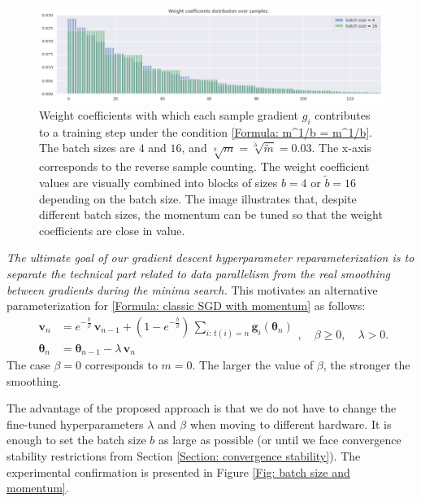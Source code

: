 \documentclass[12pt,a4paper]{amsart}
\numberwithin{equation}{section}
\theoremstyle{remark}
\begin{document}
\begin{figure}
	\centering
	\includegraphics[width=16cm,keepaspectratio=true]{images/momentum_weigth_coefficients.png}
	\caption{
		Weight coefficients with which each sample gradient
		$g_i$
		contributes to a training step under the condition
		\eqref{Formula: m^1/b = m^1/b}.
		The batch sizes are $4$ and $16$, and
		$\sqrt[b]{m} = \sqrt[\tilde b]{\tilde m} = 0.03$.
		The x-axis corresponds to the reverse sample counting.
		The weight coefficient values are visually combined into blocks of sizes
		$b=4$
		or
		$\tilde b = 16$
		depending on the batch size.
		The image illustrates that, despite different batch sizes,
		the momentum can be tuned so that the weight coefficients are close in value.
	}
	\label{Fig: momentum weight coefficients}
\end{figure}

\emph{
	The ultimate goal of our gradient descent hyperparameter reparameterization
	is to separate the technical part related to data parallelism
	from the real smoothing between gradients during the minima search.
}
This motivates an alternative parameterization for
\eqref{Formula: classic SGD with momentum} as follows:
\begin{equation}
	\begin{aligned}
		\mathbf{v}_n &= e^{-\frac{b}{\beta}}\, \mathbf{v}_{n-1}
		 	+ (1 - e^{-\frac{b}{\beta}})\, \sum_{i:\, t(i) = n} \mathbf{g}_i(\boldsymbol\theta_n) \\
		\boldsymbol\theta_n &=
			\boldsymbol\theta_{n-1} - \lambda\, \mathbf{v}_n
	\end{aligned},\quad
	\beta \geq 0, \quad
	\lambda > 0.
	\label{Formula: SGD with momentum reparameterized}
\end{equation}
The case
$\beta = 0$
corresponds to
$m=0$.
The larger the value of
$\beta$,
the stronger the smoothing.

The advantage of the proposed approach is
that we do not have to change the fine-tuned hyperparameters
$\lambda$
and
$\beta$
when moving to different hardware.
It is enough to set the batch size
$b$
as large as possible
(or until we face convergence stability restrictions from Section
\ref{Section: convergence stability}).
The experimental confirmation is presented in Figure
\ref{Fig: batch size and momentum}.
\end{document}
